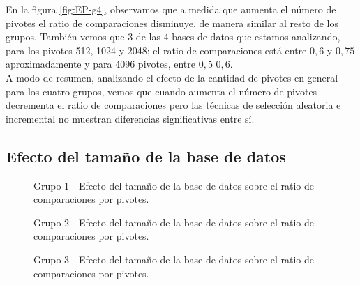 En la figura \ref{fig:EP-g4}, observamos que a medida que aumenta el n\'umero de pivotes el ratio de comparaciones disminuye, de manera similar al resto de los grupos. Tambi\'en vemos que 3 de las 4 bases de datos que estamos analizando, para los pivotes 512, 1024 y 2048; el ratio de comparaciones est\'a entre $0,6$ y $0,75$ aproximadamente y para 4096 pivotes, entre $0,5$ $0,6$.\\

A modo de resumen, analizando el efecto de la cantidad de pivotes en general para los cuatro grupos, vemos que cuando aumenta el n\'umero de pivotes decrementa el ratio de comparaciones pero las t\'ecnicas de selecci\'on aleatoria e incremental no muestran diferencias significativas entre s\'i.

\subsection{Efecto del tamaño de la base de datos}

\begin{figure}[tb]
\centering
{}
		\caption{\small Grupo 1 - Efecto del tamaño de la base de datos sobre el ratio de comparaciones por pivotes.}
		\label{fig:EDB-g1}
		\caption{\small Grupo 2 - Efecto del tamaño de la base de datos sobre el ratio de comparaciones por pivotes.}
		\label{fig:EDB-g2}
\end{figure}

\begin{figure}[tb]
\centering
{}
		\caption{\small Grupo 3 - Efecto del tamaño de la base de datos sobre el ratio de comparaciones por pivotes.}
		\label{fig:EDB-g3}
\end{figure}

